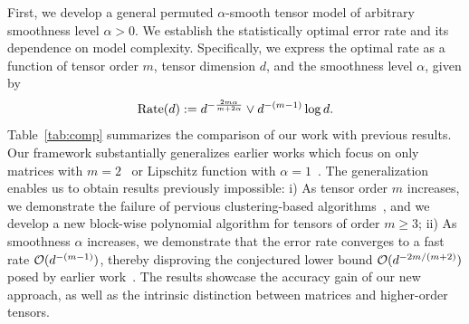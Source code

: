 \documentclass[12pt]{article}
\theoremstyle{definition}
\begin{document}
 \begin{table}[h]
    \centering
    \caption{Comparison of our results with previous work. \color{blue}For simplicity, we omit the log term in the rate. $^{*}$The optimality is achieved under extra Lipchitz monotonicity conditions. }
 \label{tab:comp}
\end{table}

First, we develop a general permuted $\alpha$-smooth tensor model of arbitrary smoothness level $\alpha>0$. We establish the statistically optimal error rate and its dependence on model complexity. {\color{blue}Specifically, we express the optimal rate as a function of tensor order $m$, tensor dimension $d$, and the smoothness level $\alpha$, given by
\begin{equation}\label{eq:rate}
\text{Rate}(d):=d^{-{2m\alpha \over m+2\alpha}} \vee d^{-(m-1)}\log d.
\end{equation}
}
Table~\ref{tab:comp} summarizes the comparison of our work with previous results.  Our framework substantially generalizes earlier works which focus on only matrices with $m=2$~\cite{gao2015rate,klopp2017oracle} or Lipschitz function with $\alpha=1$~\cite{balasubramanian2021nonparametric,li2019nearest}. The generalization enables us to obtain results previously impossible: i) As tensor order $m$ increases, we demonstrate the failure of pervious clustering-based algorithms~\cite{balasubramanian2021nonparametric,gao2015rate}, and we develop a new block-wise polynomial algorithm for tensors of order $m\geq 3$; ii) As smoothness $\alpha$ increases, we demonstrate that the error rate converges to a fast rate $\mathcal{O}(d^{-(m-1)})$, thereby disproving the conjectured lower bound $\mathcal{O}(d^{-2m/(m+2)})$ posed by earlier work~\cite{balasubramanian2021nonparametric}. The results showcase the accuracy gain of our new approach, as well as the intrinsic distinction between matrices and higher-order tensors. 
\end{document}
